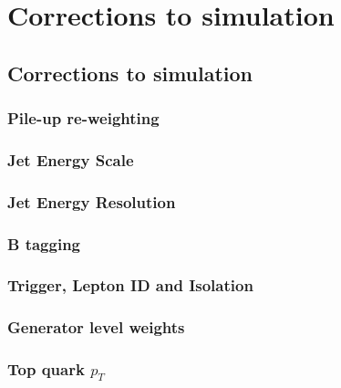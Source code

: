 \graphicspath{{chapt_dutch/}{intro/}{chapt2/}{chapt3/}{chapt4/}{chapt5/}{chapt6/}{chapt7/}{chapt8/}}

\renewcommand\evenpagerightmark{{\scshape\small Chapter 7}}
\renewcommand\oddpageleftmark{{\scshape\small Corrections to simulation}}

\hyphenation{}

\chapter[Corrections to simulation and systematic uncertainties]%
{Corrections to simulation}
\label{chapt:8}
\section{Corrections to simulation}\label{sec:correc_sim}
\subsection{Pile-up re-weighting}
\label{sec:pileup}

\subsection{Jet Energy Scale}
\label{sec:jes}

\subsection{Jet Energy Resolution}
\label{sec:jer}

\subsection{B tagging}
\label{sec:btag}

\subsection{Trigger, Lepton ID and Isolation}
\label{sec:trig_lepIdIso}

\subsection{Generator level weights}
\label{sec:genweights}

\subsection{Top quark $p_{T}$}
\label{sec:topPt_correc}

